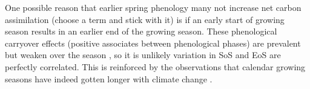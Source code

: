 \documentclass[12 pt]{article}
\begin{document}
One possible reason that earlier spring phenology many not increase net carbon assimilation (choose a term and stick with it) is if an early start of growing season results in an earlier end of the growing season. These phenological carryover effects (positive associates between phenological phases) are prevalent \citep{} but weaken over the season \citep{}, so it is unlikely variation in SoS and EoS are perfectly correlated. This is reinforced by the observations that calendar growing seasons have indeed gotten longer with climate change \citep{}. 
\end{document}
